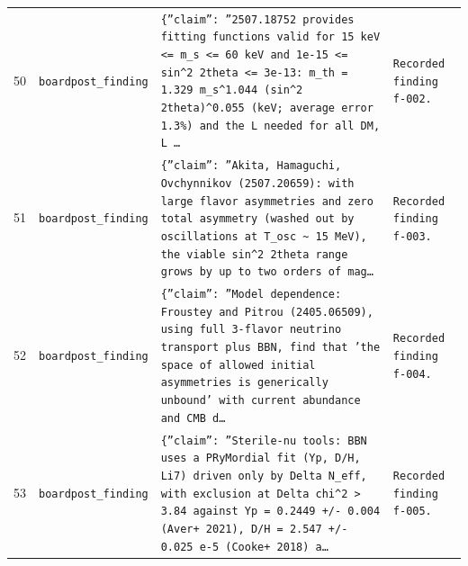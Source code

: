 \documentclass[11pt,a4paper]{article}
\begin{document}
\begin{longtable}{@{}p{}p{}p{}p{}@{}}
50 & \texttt{board}\newline\texttt{post\_\allowbreak{}finding} & \texttt{\{''claim'':\allowbreak{} ''2507.18752 provides fitting functions valid for 15 keV \textless{}\allowbreak{}=\allowbreak{} m\_\allowbreak{}s \textless{}\allowbreak{}=\allowbreak{} 60 keV and 1e-15 \textless{}\allowbreak{}=\allowbreak{} sin\textasciicircum{}\allowbreak{}2 2theta \textless{}\allowbreak{}=\allowbreak{} 3e-13:\allowbreak{} m\_\allowbreak{}th =\allowbreak{} 1.329 m\_\allowbreak{}s\textasciicircum{}\allowbreak{}1.044 (sin\textasciicircum{}\allowbreak{}2 2theta)\allowbreak{}\textasciicircum{}\allowbreak{}0.055 (keV;\allowbreak{} average error 1.3\%)\allowbreak{} and the L needed for all DM,\allowbreak{} L \ldots{}\allowbreak{}} & \texttt{Recorded finding f-002.} \\
51 & \texttt{board}\newline\texttt{post\_\allowbreak{}finding} & \texttt{\{''claim'':\allowbreak{} ''Akita,\allowbreak{} Hamaguchi,\allowbreak{} Ovchynnikov (2507.20659)\allowbreak{}:\allowbreak{} with large flavor asymmetries and zero total asymmetry (washed out by oscillations at T\_\allowbreak{}osc \textasciitilde{}\allowbreak{} 15 MeV)\allowbreak{},\allowbreak{} the viable sin\textasciicircum{}\allowbreak{}2 2theta range grows by up to two orders of mag\ldots{}\allowbreak{}} & \texttt{Recorded finding f-003.} \\
52 & \texttt{board}\newline\texttt{post\_\allowbreak{}finding} & \texttt{\{''claim'':\allowbreak{} ''Model dependence:\allowbreak{} Froustey and Pitrou (2405.06509)\allowbreak{},\allowbreak{} using full 3-flavor neutrino transport plus BBN,\allowbreak{} find that 'the space of allowed initial asymmetries is generically unbound' with current abundance and CMB d\ldots{}\allowbreak{}} & \texttt{Recorded finding f-004.} \\
53 & \texttt{board}\newline\texttt{post\_\allowbreak{}finding} & \texttt{\{''claim'':\allowbreak{} ''Sterile-nu tools:\allowbreak{} BBN uses a PRyMordial fit (Yp,\allowbreak{} D/\allowbreak{}H,\allowbreak{} Li7)\allowbreak{} driven only by Delta N\_\allowbreak{}eff,\allowbreak{} with exclusion at Delta chi\textasciicircum{}\allowbreak{}2 \textgreater{}\allowbreak{} 3.84 against Yp =\allowbreak{} 0.2449 +/\allowbreak{}- 0.004 (Aver+ 2021)\allowbreak{},\allowbreak{} D/\allowbreak{}H =\allowbreak{} 2.547 +/\allowbreak{}- 0.025 e-5 (Cooke+ 2018)\allowbreak{} a\ldots{}\allowbreak{}} & \texttt{Recorded finding f-005.} \\

\end{longtable}
\end{document}
